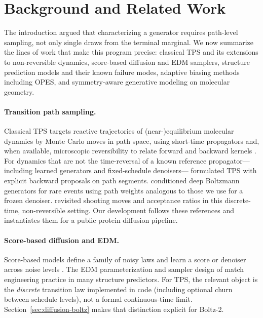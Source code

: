 \section{Background and Related Work}
\label{sec:related}

The introduction argued that characterizing a generator requires path-level
sampling, not only single draws from the terminal marginal. We now summarize the
lines of work that make this program precise: classical TPS and its
extensions to non-reversible dynamics, score-based diffusion and EDM samplers,
structure prediction models and their known failure modes, adaptive biasing
methods including OPES, and symmetry-aware generative modeling on molecular
geometry.

\paragraph{Transition path sampling.}
Classical TPS targets reactive trajectories of (near-)equilibrium molecular
dynamics by Monte Carlo moves in path space, using short-time propagators and,
when available, microscopic reversibility to relate forward and backward
kernels \citep{dellago1998,bolhuis2002}. For dynamics that are not the
time-reversal of a known reference propagator---including learned generators and
fixed-schedule denoisers---\citet{buijsman2020} formulated TPS with explicit
backward proposals on path segments. \citet{falkner2023} conditioned deep
Boltzmann generators for rare events using path weights analogous to those we
use for a frozen denoiser. \citet{falkner2024} revisited shooting moves and
acceptance ratios in this discrete-time, non-reversible setting. Our
development follows these references and instantiates them for a public
protein diffusion pipeline.

\paragraph{Score-based diffusion and EDM.}
Score-based models define a family of noisy laws and learn a score or denoiser
across noise levels \citep{song2021,ho2020}. The EDM parameterization and
sampler design of \citet{karras2022} match engineering practice in many
structure predictors. For TPS, the relevant object is the \emph{discrete}
transition law implemented in code (including optional churn between schedule
levels), not a formal continuous-time limit. Section~\ref{sec:diffusion-boltz}
makes that distinction explicit for Boltz-2.

